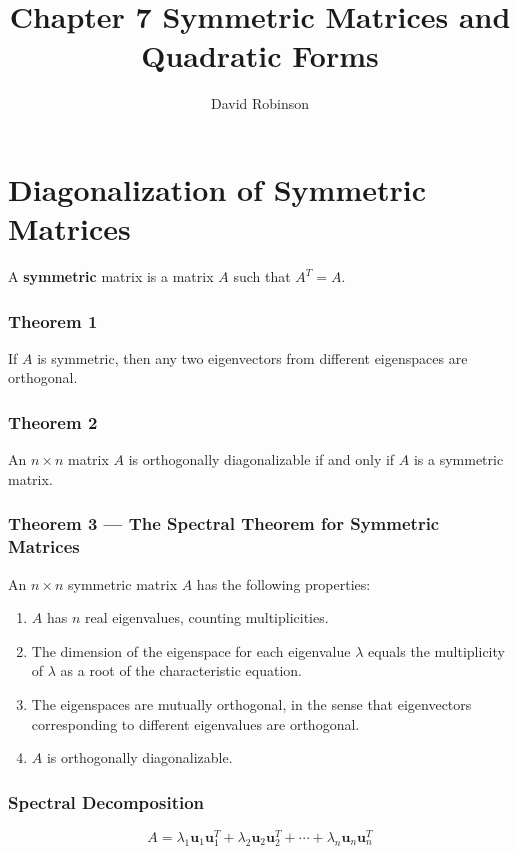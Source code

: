 \documentclass{article}
\title{Chapter 7 Symmetric Matrices and Quadratic Forms}
\author{David Robinson}
\date{}
\begin{document}
\maketitle

\section*{Diagonalization of Symmetric Matrices}

A \textbf{symmetric} matrix is a matrix $A$ such that $A^T = A$.

\subsubsection*{Theorem 1}
If $A$ is symmetric, then any two eigenvectors from different eigenspaces are orthogonal.

\subsubsection*{Theorem 2}
An $n\times n$ matrix $A$ is orthogonally diagonalizable if and only if $A$ is a symmetric matrix.

\subsubsection*{Theorem 3 --- The Spectral Theorem for Symmetric Matrices}
An $n\times n$ symmetric matrix $A$ has the following properties:
\begin{enumerate}
    \item $A$ has $n$ real eigenvalues, counting multiplicities.
    \item The dimension of the eigenspace for each eigenvalue $\lambda$ equals the multiplicity of
    $\lambda$ as a root of the characteristic equation.
    \item The eigenspaces are mutually orthogonal, in the sense that eigenvectors corresponding to
    different eigenvalues are orthogonal.
    \item $A$ is orthogonally diagonalizable.
\end{enumerate}

\subsubsection*{Spectral Decomposition}
\[A=\lambda_1\mathbf{u}_1\mathbf{u}_1^T+\lambda_2\mathbf{u}_2\mathbf{u}_2^T+\cdots +\lambda_n
\mathbf{u}_n\mathbf{u}_n^T\]
\end{document}
